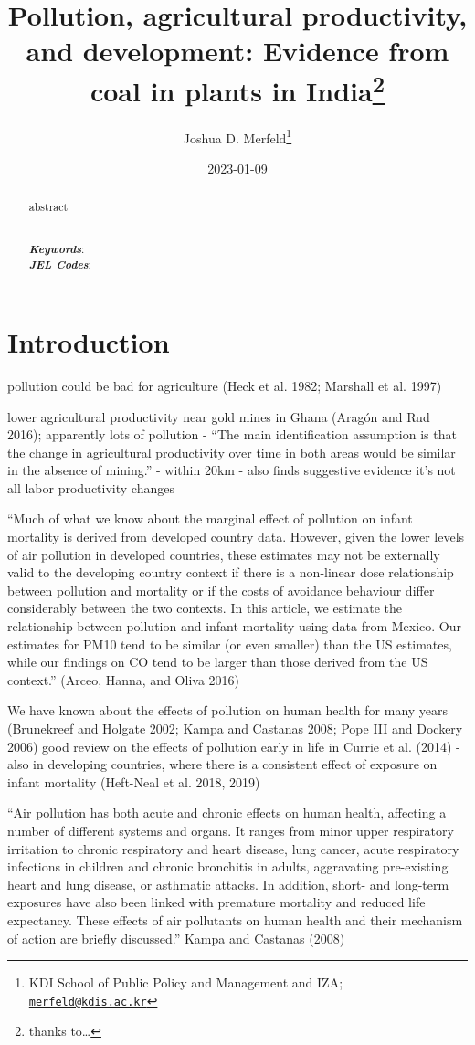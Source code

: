 \documentclass[
]{article}
\title{Pollution, agricultural productivity, and development: Evidence from coal in plants in India\footnote{thanks to\ldots{}}}
\author{Joshua D. Merfeld\footnote{KDI School of Public Policy and Management and IZA; \href{mailto:merfeld@kdis.ac.kr}{\nolinkurl{merfeld@kdis.ac.kr}}}}
\date{2023-01-09}
\begin{document}
\maketitle
\begin{abstract}
\noindent abstract\\
\strut \\
\textbf{\textit{Keywords}}:\\
\textbf{\textit{JEL Codes}}:
\end{abstract}

\newpage
\doublespacing

\hypertarget{introduction}{%
\section{Introduction}\label{introduction}}

pollution could be bad for agriculture (Heck et al. 1982; Marshall et al. 1997)

lower agricultural productivity near gold mines in Ghana (Aragón and Rud 2016); apparently lots of pollution
- ``The main identification assumption is that the change in agricultural productivity over time in both areas would be similar in the absence of mining.''
- within 20km
- also finds suggestive evidence it's not all labor productivity changes

``Much of what we know about the marginal effect of pollution on infant mortality is derived from developed country data. However, given the lower levels of air pollution in developed countries, these estimates may not be externally valid to the developing country context if there is a non-linear dose relationship between pollution and mortality or if the costs of avoidance behaviour differ considerably between the two contexts. In this article, we estimate the relationship between pollution and infant mortality using data from Mexico. Our estimates for PM10 tend to be similar (or even smaller) than the US estimates, while our findings on CO tend to be larger than those derived from the US context.'' (Arceo, Hanna, and Oliva 2016)

We have known about the effects of pollution on human health for many years (Brunekreef and Holgate 2002; Kampa and Castanas 2008; Pope III and Dockery 2006)
good review on the effects of pollution early in life in Currie et al. (2014)
- also in developing countries, where there is a consistent effect of exposure on infant mortality (Heft-Neal et al. 2018, 2019)

``Air pollution has both acute and chronic effects on human health, affecting a number of different systems and organs. It ranges from minor upper respiratory irritation to chronic respiratory and heart disease, lung cancer, acute respiratory infections in children and chronic bronchitis in adults, aggravating pre-existing heart and lung disease, or asthmatic attacks. In addition, short- and long-term exposures have also been linked with premature mortality and reduced life expectancy. These effects of air pollutants on human health and their mechanism of action are briefly discussed.'' Kampa and Castanas (2008)
\end{document}
